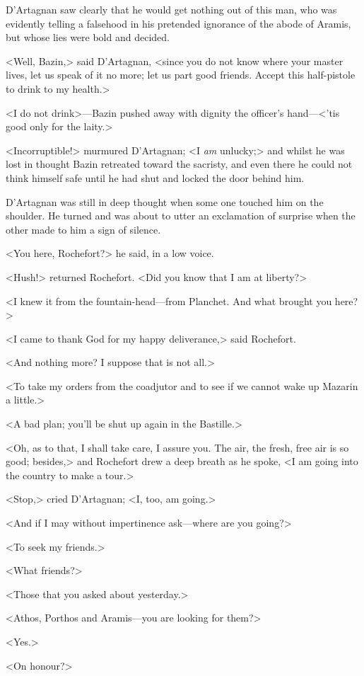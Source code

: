 D'Artagnan saw clearly that he would get nothing out of this man, who was evidently telling a falsehood in his pretended ignorance of the abode of Aramis, but whose lies were bold and decided.

<Well, Bazin,> said D'Artagnan, <since you do not know where your master lives, let us speak of it no more; let us part good friends. Accept this half-pistole to drink to my health.>

<I do not drink>—Bazin pushed away with dignity the officer's hand—<'tis good only for the laity.>

<Incorruptible!> murmured D'Artagnan; <I \emph{am} unlucky;> and whilst he was lost in thought Bazin retreated toward the sacristy, and even there he could not think himself safe until he had shut and locked the door behind him.

D'Artagnan was still in deep thought when some one touched him on the shoulder. He turned and was about to utter an exclamation of surprise when the other made to him a sign of silence.

<You here, Rochefort?> he said, in a low voice.

<Hush!> returned Rochefort. <Did you know that I am at liberty?>

<I knew it from the fountain-head—from Planchet. And what brought you here?>

<I came to thank God for my happy deliverance,> said Rochefort.

<And nothing more? I suppose that is not all.>

<To take my orders from the coadjutor and to see if we cannot wake up Mazarin a little.>

<A bad plan; you'll be shut up again in the Bastille.>

<Oh, as to that, I shall take care, I assure you. The air, the fresh, free air is so good; besides,> and Rochefort drew a deep breath as he spoke, <I am going into the country to make a tour.>

<Stop,> cried D'Artagnan; <I, too, am going.>

<And if I may without impertinence ask—where are you going?>

<To seek my friends.>

<What friends?>

<Those that you asked about yesterday.>

<Athos, Porthos and Aramis—you are looking for them?>

<Yes.>

<On honour?>

